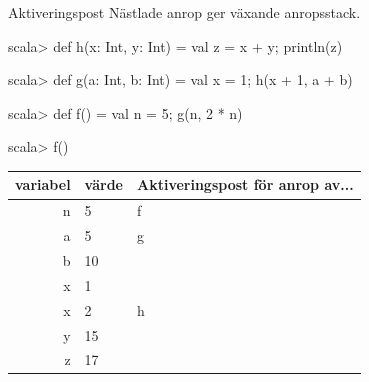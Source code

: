 %
%
%

\begin{Slide}{Aktiveringspost}\SlideFontSmall
	Nästlade anrop ger växande anropsstack.
	\begin{REPLsmall}
		scala> def h(x: Int, y: Int) = { val z = x + y; println(z) }

		scala> def g(a: Int, b: Int) = { val x = 1; h(x + 1, a + b) }

		scala> def f() = { val n = 5; g(n, 2 * n) }

		scala> f()

	\end{REPLsmall}

	\pause

	\begin{tabular}{|r | l | l |} \hline

		variabel & värde & Aktiveringspost för anrop av... \\ \hline \hline
		\pause
		n        & 5     & f                               \\ \hline
		\pause
		a        & 5     & g                               \\
		b        & 10    &                                 \\
		x        & 1     &                                 \\  \hline
		\pause
		x        & 2     & h                               \\
		y        & 15    &                                 \\
		z        & 17    &                                 \\ \hline
	\end{tabular}
\end{Slide}

